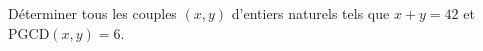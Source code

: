 \documentclass[a4paper,12pt]{article}
\begin{document}
\begin{exercice}[title=Exercice 13 $\quad \star \star \quad$ {[Calculer, Chercher]}]
Déterminer tous les couples $(x,y)$ d'entiers naturels tels que $x+y=42$ et $\mathrm{PGCD}(x,y)=6.$
\end{exercice}

% 
% 
% 
% 
% 
% 
% 
% 
\end{document}
